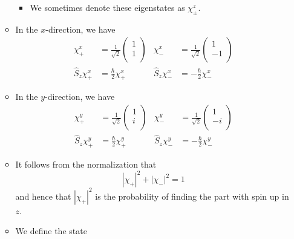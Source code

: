\documentclass[../notes.tex]{subfiles}
\begin{document}
\begin{itemize}
\begin{itemize}
        \begin{itemize}
            \item We sometimes denote these eigenstates as $\chi_\pm^z$.
        \end{itemize}
        \item In the $x$-direction, we have
        \begin{align*}
            \chi_+^x &= \frac{1}{\sqrt{2}}
            \begin{pmatrix}
                1\\
                1\\
            \end{pmatrix}&
                \chi_-^x &= \frac{1}{\sqrt{2}}
                \begin{pmatrix}
                    1\\
                    -1\\
                \end{pmatrix}\\
            \hat{S}_z\chi_+^x &= \frac{\hbar}{2}\chi_+^x&
                \hat{S}_z\chi_-^x &= -\frac{\hbar}{2}\chi_-^x
        \end{align*}
        \item In the $y$-direction, we have
        \begin{align*}
            \chi_+^y &= \frac{1}{\sqrt{2}}
            \begin{pmatrix}
                1\\
                i\\
            \end{pmatrix}&
                \chi_-^y &= \frac{1}{\sqrt{2}}
                \begin{pmatrix}
                    1\\
                    -i\\
                \end{pmatrix}\\
            \hat{S}_z\chi_+^y &= \frac{\hbar}{2}\chi_+^y&
                \hat{S}_z\chi_-^y &= -\frac{\hbar}{2}\chi_-^y
        \end{align*}
        \item It follows from the normalization that
        \begin{equation*}
            |\chi_+|^2+|\chi_-|^2 = 1
        \end{equation*}
        and hence that $|\chi_+|^2$ is the probability of finding the part with spin up in $z$.
        \item We define the state

\end{itemize}
\end{itemize}
\end{document}
